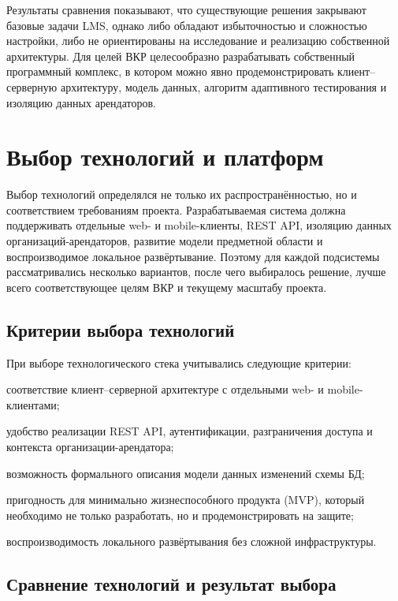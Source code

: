 Результаты сравнения показывают, что существующие решения закрывают базовые задачи LMS, однако либо обладают избыточностью и сложностью настройки, либо не ориентированы на исследование и реализацию собственной архитектуры. Для целей ВКР целесообразно разрабатывать собственный программный комплекс, в котором можно явно продемонстрировать клиент--серверную архитектуру, модель данных, алгоритм адаптивного тестирования и изоляцию данных арендаторов.

\section{Выбор технологий и платформ}

Выбор технологий определялся не только их распространённостью, но и соответствием требованиям проекта. Разрабатываемая система должна поддерживать отдельные web- и mobile-клиенты, REST API, изоляцию данных организаций-арендаторов, развитие модели предметной области и воспроизводимое локальное развёртывание. Поэтому для каждой подсистемы рассматривались несколько вариантов, после чего выбиралось решение, лучше всего соответствующее целям ВКР и текущему масштабу проекта.

\subsection{Критерии выбора технологий}

При выборе технологического стека учитывались следующие критерии:
\begin{parenlist}
  \item соответствие клиент--серверной архитектуре с отдельными web- и mobile-клиентами;
  \item удобство реализации REST API, аутентификации, разграничения доступа и контекста организации-арендатора;
  \item возможность формального описания модели данных изменений схемы БД;
  \item пригодность для минимально жизнеспособного продукта (MVP), который необходимо не только разработать, но и продемонстрировать на защите;
  \item воспроизводимость локального развёртывания без сложной инфраструктуры.
\end{parenlist}

\subsection{Сравнение технологий и результат выбора}

